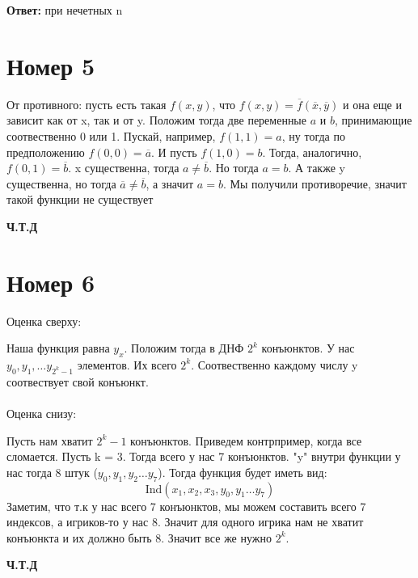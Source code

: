 \documentclass[a4paper,12pt]{article}
\begin{document}
\begin{center}
\textbf{Ответ: } при нечетных n
\end{center} 

\section*{Номер 5}
От противного: пусть есть такая $f(x, y)$, что $f(x, y) = \overline{f} (\overline{x}, \overline{y})$ и она еще и зависит как от x, так и от y. Положим тогда две переменные $a$ и $b$, принимающие соотвественно 0 или 1. Пускай, например, $f(1, 1) = a$, ну тогда по предположению $f(0, 0) = \overline{a}$. И пусть $f(1, 0) = b$. Тогда, аналогично, $f(0, 1) = \overline{b}$. x существенна, тогда $a \neq \overline{b}$. Но тогда $a = b$. А также y существенна, но тогда $\overline{a} \neq \overline{b}$, а значит $a = b$. Мы получили противоречие, значит такой функции не существует
\begin{center}
\textbf{Ч.Т.Д} 
\end{center}
\section*{Номер 6}
Оценка сверху:

Наша функция равна $y_x$. Положим тогда в ДНФ $2^k$ конъюнктов. У нас $y_0, y_1, \ldots y_{2^k - 1}$ элементов. Их всего $2^k$. Соотвественно каждому числу y соотвествует свой конъюнкт. 
\\\\
Оценка снизу:

Пусть нам хватит $2^k - 1$ конъюнктов. Приведем контрпример, когда все сломается. Пусть k = 3. Тогда всего у нас 7 конъюнктов. "y" внутри функции у нас тогда 8 штук ($y_0, y_1, y_2 \ldots y_7$). Тогда функция будет иметь вид:
\[
\text{Ind} (x_1, x_2, x_3, y_0, y_1 \ldots y_7)
\]
Заметим, что т.к у нас всего 7 конъюнктов, мы можем составить всего 7 индексов, а игриков-то у нас 8. Значит для одного игрика нам не хватит конъюнкта и их должно быть 8. Значит все же нужно $2^k$.
\begin{center}
\textbf{Ч.Т.Д } 
\end{center}
\end{document}

